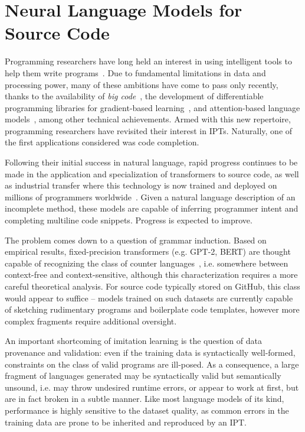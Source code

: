 \documentclass[10pt]{article}
\begin{document}
  \section{Neural Language Models for Source Code}

Programming researchers have long held an interest in using intelligent tools to help them write programs~\cite{bras1993artificial}. Due to fundamental limitations in data and processing power, many of these ambitions have come to pass only recently, thanks to the availability of \textit{big code}~\cite{allamanis2018survey}, the development of differentiable programming libraries for gradient-based learning~\cite{baydin2018automatic}, and attention-based language models~\cite{vaswani2017attention}, among other technical achievements. Armed with this new repertoire, programming researchers have revisited their interest in IPTs. Naturally, one of the first applications considered was code completion.

 Following their initial success in natural language, rapid progress continues to be made in the application and specialization of transformers to source code, as well as industrial transfer where this technology is now trained and deployed on millions of programmers worldwide~\cite{chen2021evaluating}. Given a natural language description of an incomplete method, these models are capable of inferring programmer intent and completing multiline code snippets. Progress is expected to improve.

The problem comes down to a question of grammar induction. Based on empirical results, fixed-precision transformers (e.g. GPT-2, BERT) are thought capable of recognizing the class of counter languages~\cite{bhattamishra2020ability}, i.e. somewhere between context-free and context-sensitive, although this characterization requires a more careful theoretical analysis. For source code typically stored on GitHub, this class would appear to suffice -- models trained on such datasets are currently capable of sketching rudimentary programs and boilerplate code templates, however more complex fragments require additional oversight.

An important shortcoming of imitation learning is the question of data provenance and validation: even if the training data is syntactically well-formed, constraints on the class of valid programs are ill-posed. As a consequence, a large fragment of languages generated may be syntactically valid but semantically unsound, i.e. may throw undesired runtime errors, or appear to work at first, but are in fact broken in a subtle manner. Like most language models of its kind, performance is highly sensitive to the dataset quality, as common errors in the training data are prone to be inherited and reproduced by an IPT.
\end{document}
